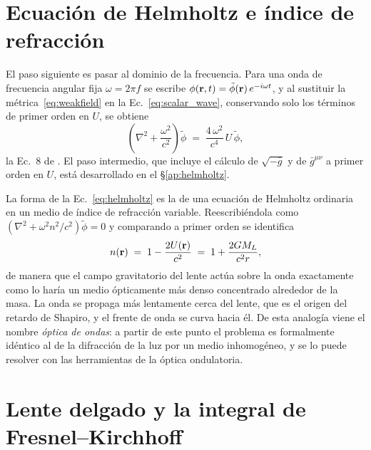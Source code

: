 \documentclass[11pt,a4paper,openany]{book}
\begin{document}
\section{Ecuaci\'on de Helmholtz e \'indice de refracci\'on}
\label{sec:helmholtz}

El paso siguiente es pasar al dominio de la frecuencia. Para una onda de
frecuencia angular fija $\omega=2\pi f$ se escribe
$\phi(\vb r,t)=\tilde\phi(\vb r)\,e^{-i\omega t}$, y al sustituir la
m\'etrica~\eqref{eq:weakfield} en la Ec.~\eqref{eq:scalar_wave}, conservando
solo los t\'erminos de primer orden en $U$, se obtiene
\begin{equation}
  \left(\nabla^{2}+\frac{\omega^{2}}{c^{2}}\right)\tilde\phi
  \;=\;\frac{4\,\omega^{2}}{c^{4}}\,U\,\tilde\phi ,
  \label{eq:helmholtz}
\end{equation}
la Ec.~8 de \citet{Takahashi2003}. El paso intermedio, que incluye el c\'alculo
de $\sqrt{-\bar g}$ y de $\bar g^{\mu\nu}$ a primer orden en $U$, est\'a
desarrollado en el \S\ref{ap:helmholtz}.

La forma de la Ec.~\eqref{eq:helmholtz} es la de una ecuaci\'on de Helmholtz
ordinaria en un medio de \'indice de refracci\'on variable. Reescribi\'endola
como $\left(\nabla^{2}+\omega^{2}n^{2}/c^{2}\right)\tilde\phi=0$ y comparando
a primer orden se identifica
\begin{equation}
  n(\vb r)\;=\;1-\frac{2U(\vb r)}{c^{2}}\;=\;1+\frac{2GM_L}{c^{2}r} ,
  \label{eq:refractive_index}
\end{equation}
de manera que el campo gravitatorio del lente act\'ua sobre la onda
exactamente como lo har\'ia un medio \'opticamente m\'as denso concentrado
alrededor de la masa. La onda se propaga m\'as lentamente cerca del lente,
que es el origen del retardo de Shapiro, y el frente de onda se curva hacia
\'el. De esta analog\'ia viene el nombre \emph{\'optica de ondas}: a partir de
este punto el problema es formalmente id\'entico al de la difracci\'on de la
luz por un medio inhomog\'eneo, y se lo puede resolver con las herramientas de
la \'optica ondulatoria.

\section{Lente delgado y la integral de Fresnel--Kirchhoff}
\label{sec:lentedelgado}
\end{document}
